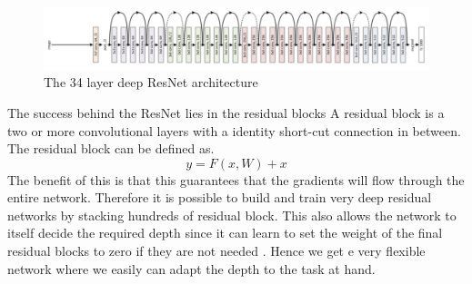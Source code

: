 \documentclass[a4paper,11pt]{article}
\begin{document}
\begin{figure}[h!]
  \centering
      \includegraphics[scale=0.25]{resnet}
  \caption{The 34 layer deep ResNet architecture \cite{simonyan_very_2014}} \label{fig:vgg}
\end{figure}
The success behind the ResNet lies in the residual blocks A residual block is a two or more convolutional layers with a identity short-cut connection in between. The residual block can be defined as.
\begin{equation}
y=F(x, W) + x
\end{equation}
The benefit of this is that this guarantees that the gradients will flow through the entire network. Therefore it is possible to build and train very deep residual networks by stacking hundreds of residual block. This also allows the network to itself decide the required depth since it can learn to set the weight of the final residual blocks to zero if they are not needed \cite{he_deep_2015}. Hence we get e very flexible network where we easily can adapt the depth to the task at hand.
\end{document}
